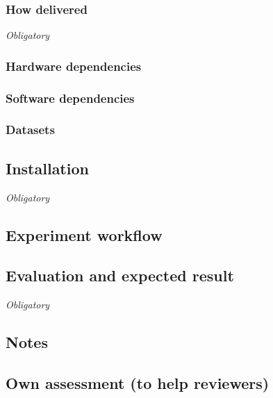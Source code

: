 \documentclass{sigplanconf}
\begin{document}
\subsubsection{How delivered}

{\em Obligatory}

\subsubsection{Hardware dependencies}

\subsubsection{Software dependencies}

\subsubsection{Datasets}

\subsection{Installation}

{\em Obligatory}

\subsection{Experiment workflow}

\subsection{Evaluation and expected result}

{\em Obligatory}

\subsection{Notes}

\subsection{Own assessment (to help reviewers)}
\end{document}
